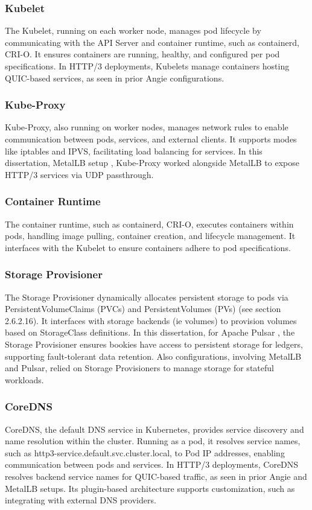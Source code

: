 \subsubsection{Kubelet}
The Kubelet, running on each worker node, manages pod lifecycle by communicating with the API Server and container runtime, such as containerd, CRI-O. It ensures containers are running, healthy, and configured per pod specifications. In HTTP/3 deployments, Kubelets manage containers hosting QUIC-based services, as seen in prior Angie configurations.

\subsubsection{Kube-Proxy}
Kube-Proxy, also running on worker nodes, manages network rules to enable communication between pods, services, and external clients. It supports modes like iptables and IPVS, facilitating load balancing for services. In this dissertation, MetalLB setup \cite{metallb-docs}, Kube-Proxy worked alongside MetalLB to expose HTTP/3 services via UDP passthrough.

\subsubsection{Container Runtime}
The container runtime, such as containerd, CRI-O, executes containers within pods, handling image pulling, container creation, and lifecycle management. It interfaces with the Kubelet to ensure containers adhere to pod specifications.

\subsubsection{Storage Provisioner}
The Storage Provisioner dynamically allocates persistent storage to pods via PersistentVolumeClaims (PVCs) and PersistentVolumes (PVs) (see section 2.6.2.16). It interfaces with storage backends (ie volumes) to provision volumes based on StorageClass definitions. In this dissertation, for Apache Pulsar \cite{pulsar-helm-repo}, the Storage Provisioner ensures bookies have access to persistent storage for ledgers, supporting fault-tolerant data retention. Also configurations, involving MetalLB and Pulsar, relied on Storage Provisioners to manage storage for stateful workloads.

\subsubsection{CoreDNS}
CoreDNS, the default DNS service in Kubernetes, provides service discovery and name resolution within the cluster. Running as a pod, it resolves service names, such as http3-service.default.svc.cluster.local, to Pod IP addresses, enabling communication between pods and services. In HTTP/3 deployments, CoreDNS resolves backend service names for QUIC-based traffic, as seen in prior Angie and MetalLB setups. Its plugin-based architecture supports customization, such as integrating with external DNS providers.

